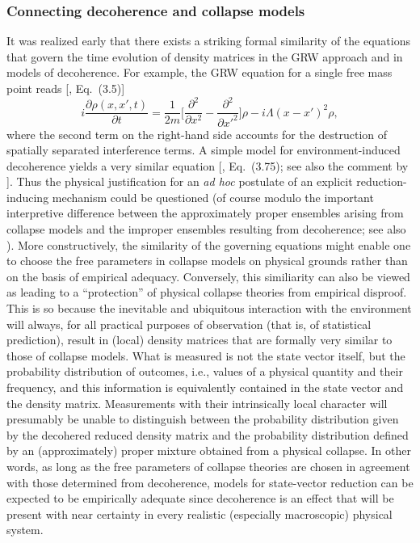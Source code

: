 \documentclass[twocolumn,rmp,aps,amsmath,amsfonts,noshowkeys,noshowpacs]{revtex4}
\begin{document}
\subsubsection{Connecting decoherence and collapse models} 

It was realized early that there exists a striking formal similarity
of the equations that govern the time evolution of density matrices in
the GRW approach and in models of decoherence. For example, the GRW
equation for a single free mass point reads
[\citealp{Ghirardi:1986:ud}, Eq.~(3.5)]
%
\begin{equation} 
i \frac{\partial
  \rho(x,x',t)}{\partial t} = \frac{1}{2m} \bigg[
\frac{\partial^2}{\partial x^2} - \frac{\partial^2}{\partial x'^2}
\bigg] \rho - i \Lambda (x-x')^2 \rho, 
\end{equation}
%
where the second term on the right-hand side accounts for the
destruction of spatially separated interference terms. A simple model
for environment-induced decoherence yields a very similar equation
[\citealp{Joos:1985:iu}, Eq.~(3.75); see also the comment by
\citealp{Joos:1987:yu}]. Thus the physical justification for an
\emph{ad hoc} postulate of an explicit reduction-inducing mechanism
could be questioned (of course modulo the important interpretive
difference between the approximately proper ensembles arising from
collapse models and the improper ensembles resulting from decoherence;
see also \citealp{Ghirardi:1987:po}). More constructively, the
similarity of the governing equations might enable one to choose the
free parameters in collapse models on physical grounds rather than on
the basis of empirical adequacy.  Conversely, this similiarity can
also be viewed as leading to a ``protection'' of physical collapse
theories from empirical disproof.  This is so because the inevitable
and ubiquitous interaction with the environment will always, for all
practical purposes of observation (that is, of statistical
prediction), result in (local) density matrices that are formally very
similar to those of collapse models. What is measured is not the state
vector itself, but the probability distribution of outcomes, i.e.,
values of a physical quantity and their frequency, and this
information is equivalently contained in the state vector and the
density matrix.  Measurements with their intrinsically local character
will presumably be unable to distinguish between the probability
distribution given by the decohered reduced density matrix and the
probability distribution defined by an (approximately) proper mixture
obtained from a physical collapse. In other words, as long as the free
parameters of collapse theories are chosen in agreement with those
determined from decoherence, models for state-vector reduction can be
expected to be empirically adequate since decoherence is an effect
that will be present with near certainty in every realistic
(especially macroscopic) physical system.
\end{document}
